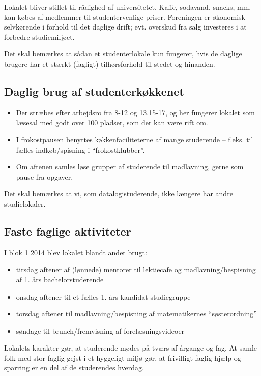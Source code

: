 \documentclass{article}
\begin{document}
Lokalet bliver stillet til rådighed af universitetet. Kaffe, sodavand, snacks,
mm. kan købes af medlemmer til studentervenlige priser. Foreningen er økonomisk
selvkørende i forhold til det daglige drift; evt. overskud fra salg investeres
i at forbedre studiemiljøet.

Det skal bemærkes at sådan et studenterlokale kun fungerer, hvis de daglige
brugere har et stærkt (fagligt) tilhørsforhold til stedet og hinanden.

\subsection{Daglig brug af studenterkøkkenet}

\begin{itemize}
\itemsep0em 
\item Der stræbes efter arbejdsro fra 8-12 og 13.15-17, og her fungerer lokalet
som læsesal med godt over 100 pladser, som der kan være rift om.
\item I frokostpausen benyttes køkkenfaciliteterne af mange studerende -- f.eks. 
til fælles indkøb/spisning i ``frokostklubber''.
\item Om aftenen samles løse grupper af studerende til madlavning, gerne som
pause fra opgaver.
\end{itemize}

Det skal bemærkes at vi, som datalogistuderende, ikke længere har andre studielokaler.

\subsection{Faste faglige aktiviteter}

I blok 1 2014 blev lokalet blandt andet brugt:
\begin{itemize}
\itemsep0em 
\item tirsdag aftener af (lønnede) mentorer til lektiecafe og madlavning/bespisning af 1. års
bachelorstuderende
\item onsdag aftener til et fælles 1. års kandidat studiegruppe
\item torsdag aftener til madlavning/bespisning af matematikernes ``søsterordning''
\item søndage til brunch/fremvisning af forelæsningsvideoer
\end{itemize}

Lokalets karakter gør, at studerende mødes på tværs af årgange og
fag. At samle folk med stor faglig gejst i et hyggeligt miljø gør,
at frivilligt faglig hjælp og sparring er en del af de studerendes hverdag.
\end{document}
